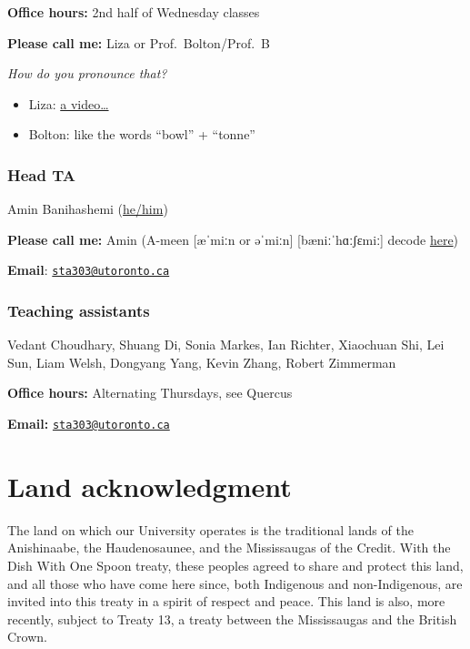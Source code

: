 \documentclass[
  openany]{book}
\begin{document}
\textbf{Office hours:} 2nd half of Wednesday classes

\textbf{Please call me:} Liza or Prof.~Bolton/Prof.~B

\emph{How do you pronounce that?}

\begin{itemize}
\item
  Liza: \href{https://www.youtube.com/watch?v=hWURas7fYwk}{a video\ldots{}}
\item
  Bolton: like the words ``bowl'' + ``tonne''
\end{itemize}

\hypertarget{head-ta}{%
\subsubsection{Head TA}\label{head-ta}}

Amin Banihashemi (\href{https://www.mypronouns.org/he-him}{he/him})

\textbf{Please call me:} Amin (A-meen {[}æˈmiːn or əˈmiːn{]} {[}bæniːˈhɑːʃɛmiː{]} decode \href{https://easypronunciation.com/en/phonetic-symbols-chart/british-english/ipa}{here})

\textbf{Email}: \href{mailto:sta303@utoronto.ca}{\nolinkurl{sta303@utoronto.ca}}

\hypertarget{teaching-assistants}{%
\subsubsection{Teaching assistants}\label{teaching-assistants}}

Vedant Choudhary, Shuang Di, Sonia Markes, Ian Richter, Xiaochuan Shi, Lei Sun, Liam Welsh, Dongyang Yang, Kevin Zhang, Robert Zimmerman

\textbf{Office hours:} Alternating Thursdays, see Quercus

\textbf{Email:} \href{mailto:sta303@utoronto.ca}{\nolinkurl{sta303@utoronto.ca}}

\hypertarget{land-acknowledgment}{%
\section{Land acknowledgment}\label{land-acknowledgment}}

The land on which our University operates is the traditional lands of the Anishinaabe, the Haudenosaunee, and the Mississaugas of the Credit. With the Dish With One Spoon treaty, these peoples agreed to share and protect this land, and all those who have come here since, both Indigenous and non-Indigenous, are invited into this treaty in a spirit of respect and peace. This land is also, more recently, subject to Treaty 13, a treaty between the Mississaugas and the British Crown.
\end{document}
